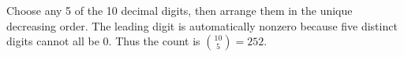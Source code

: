Choose any 5 of the 10 decimal digits, then arrange them in the unique decreasing order. The leading digit is automatically nonzero because five distinct digits cannot all be 0. Thus the count is $\boxed{\binom{10}{5}=252}$.
